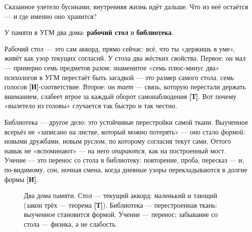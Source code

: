 \documentclass[11pt,letterpaper]{article}
\newcommand{\stT}{\textbf{[Т]}\xspace}
\newcommand{\stI}{\textbf{[И]}\xspace}
\begin{document}
Сказанное улетело бусинами; внутренняя жизнь идёт дальше. Что из неё
остаётся --- и где именно оно хранится?

У памяти в УГМ два дома: \textbf{рабочий стол} и \textbf{библиотека}.

Рабочий стол --- это сам аккорд, прямо сейчас: всё, что ты «держишь в
уме», живёт как узор текущих согласий. У стола два жёстких свойства.
Первое: он мал --- примерно семь предметов разом; знаменитое «семь
плюс-минус два» психологов в УГМ перестаёт быть загадкой --- это
размер самого стола, семь голосов \stI-соответствие. Второе: он
\emph{тает} --- связь, которую перестали держать вниманием, слабеет
втрое за каждый оборот самонаблюдения \stT. Вот почему «вылетело из
головы» случается так быстро и так честно.

Библиотека --- другое дело: это устойчивые перестройки самой
ткани. Выученное всерьёз не «записано на листке, который можно
потерять» --- оно стало \emph{формой}: новыми дружбами, новым руслом,
по которому согласия текут сами. Оттого навык не «вспоминают» ---
на него \emph{опираются}, как на построенный мост. Учение --- это
перенос со стола в библиотеку: повторение, проба, пересказ --- и,
по-видимому, сон, ночная смена, когда дневные узоры перекладываются
в долгие формы \stI.

\begin{figure}[H]
\centering
{}
\caption{Два дома памяти. Стол --- текущий аккорд: маленький и
тающий (закон трёх --- теорема \stT). Библиотека --- перестроенная
ткань: выученное становится формой. Учение --- перенос; забывание со
стола --- физика, а не слабость.}
\label{fig:memory}
\end{figure}
\end{document}
